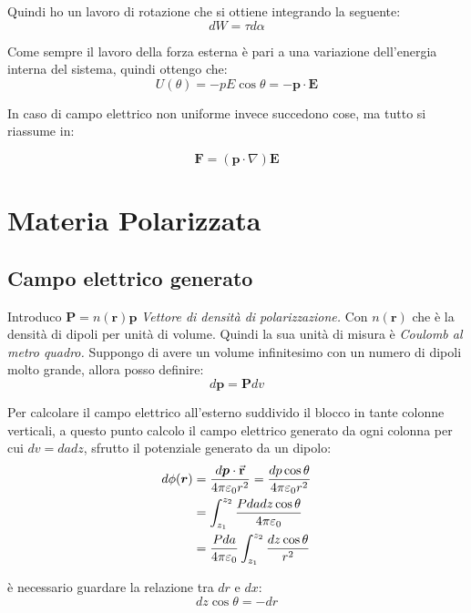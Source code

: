 \documentclass[a4paper]{scrarticle}
\begin{document}
Quindi ho un lavoro di rotazione che si ottiene integrando la seguente:
\begin{equation*}
    dW = \tau d\alpha
\end{equation*}

Come sempre il lavoro della forza esterna è pari a una variazione dell'energia interna del sistema, quindi ottengo che:
\begin{equation*}
    U(\theta) = -pE\cos \theta = - \bm p \cdot \bm E
\end{equation*}

In caso di campo elettrico non uniforme invece succedono cose, ma tutto si riassume in:

\begin{equation*}
    \bm F = (\bm p \cdot \nabla)\bm E
\end{equation*}

\section{Materia Polarizzata}

\subsection{Campo elettrico generato}

Introduco $\bm P = n(\bm r)\bm p$ \emph{Vettore di densità di polarizzazione.}
Con $n(\bm r)$ che è la densità di dipoli per unità di volume.
Quindi la sua unità di misura è \emph{Coulomb al metro quadro.}
Suppongo di avere un volume infinitesimo con un numero di dipoli molto grande, allora posso definire:
\begin{equation*}
    d\bm p = \bm P dv
\end{equation*}

Per calcolare il campo elettrico all'esterno suddivido il blocco in tante colonne verticali, a questo punto calcolo il campo elettrico generato da ogni colonna per cui $dv = da dz$, sfrutto il potenziale generato da un dipolo:
\begin{align*}
    d\phi(\bm r) &= \frac{d\bm p \cdot \va r}{4\pi\varepsilon_0r^2}= \frac{dp\cos\theta}{4\pi\varepsilon_0r^2}\\
    &= \int_{z_1}^{z_2}\frac{Pdadz\cos \theta}{4\pi\varepsilon_0}\\
    &= \frac{Pda}{4\pi\varepsilon_0}\int_{z_1}^{z_2}\frac{dz \cos \theta}{r^2}
\end{align*}

è necessario guardare la relazione tra $dr$ e $dx$:
\begin{equation*}
    dz \cos \theta = -dr
\end{equation*}
\end{document}
